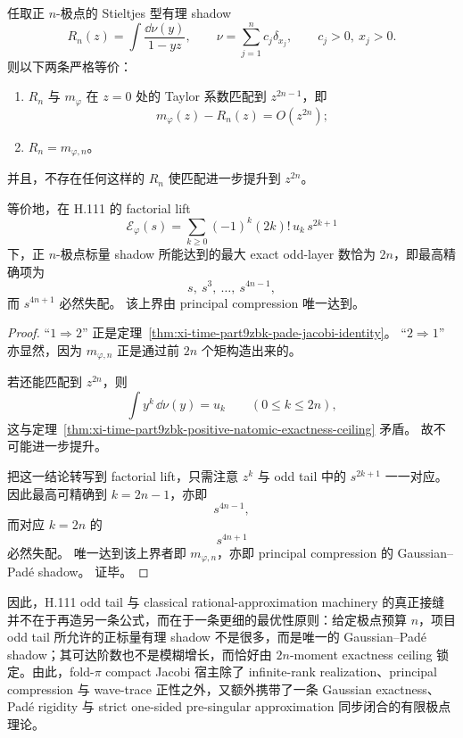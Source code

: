 \begin{theorem}\label{thm:xi-time-part9zbk-pole-count-optimality}
任取正 \(n\)-极点的 Stieltjes 型有理 shadow
\[
R_n(z)=\int\frac{\dd\nu(y)}{1-yz},
\qquad
\nu=\sum_{j=1}^{n}c_j\delta_{x_j},
\qquad
c_j>0,\ x_j>0.
\]
则以下两条严格等价：
\begin{enumerate}
  \item \(R_n\) 与 \(m_\varphi\) 在 \(z=0\) 处的 Taylor 系数匹配到 \(z^{2n-1}\)，即
  \[
  m_\varphi(z)-R_n(z)=O(z^{2n});
  \]
  \item \(R_n=m_{\varphi,n}\)。
\end{enumerate}
并且，不存在任何这样的 \(R_n\) 使匹配进一步提升到 \(z^{2n}\)。

等价地，在 H.111 的 factorial lift
\[
\mathcal E_\varphi(s)=\sum_{k\ge 0}(-1)^k(2k)!\,u_k\,s^{2k+1}
\]
下，正 \(n\)-极点标量 shadow 所能达到的最大 exact odd-layer 数恰为 \(2n\)，即最高精确项为
\[
s,\ s^3,\ \dots,\ s^{4n-1},
\]
而 \(s^{4n+1}\) 必然失配。
该上界由 principal compression 唯一达到。
\end{theorem}
\begin{proof}
“\(1\Rightarrow 2\)” 正是定理~\ref{thm:xi-time-part9zbk-pade-jacobi-identity}。
“\(2\Rightarrow 1\)” 亦显然，因为 \(m_{\varphi,n}\) 正是通过前 \(2n\) 个矩构造出来的。

若还能匹配到 \(z^{2n}\)，则
\[
\int y^k\,\dd\nu(y)=u_k
\qquad (0\le k\le 2n),
\]
这与定理~\ref{thm:xi-time-part9zbk-positive-natomic-exactness-ceiling} 矛盾。
故不可能进一步提升。

把这一结论转写到 factorial lift，只需注意 \(z^k\) 与 odd tail 中的 \(s^{2k+1}\) 一一对应。
因此最高可精确到 \(k=2n-1\)，亦即
\[
s^{4n-1},
\]
而对应 \(k=2n\) 的
\[
s^{4n+1}
\]
必然失配。
唯一达到该上界者即 \(m_{\varphi,n}\)，亦即 principal compression 的 Gaussian--Pad\'e shadow。
证毕。
\end{proof}

\noindent
因此，H.111 odd tail 与 classical rational-approximation machinery 的真正接缝并不在于再造另一条公式，而在于一条更细的最优性原则：给定极点预算 \(n\)，项目 odd tail 所允许的正标量有理 shadow 不是很多，而是唯一的 Gaussian--Pad\'e shadow；其可达阶数也不是模糊增长，而恰好由 \(2n\)-moment exactness ceiling 锁定。由此，fold-\(\pi\) compact Jacobi 宿主除了 infinite-rank realization、principal compression 与 wave-trace 正性之外，又额外携带了一条 Gaussian exactness、Pad\'e rigidity 与 strict one-sided pre-singular approximation 同步闭合的有限极点理论。

\endinput
